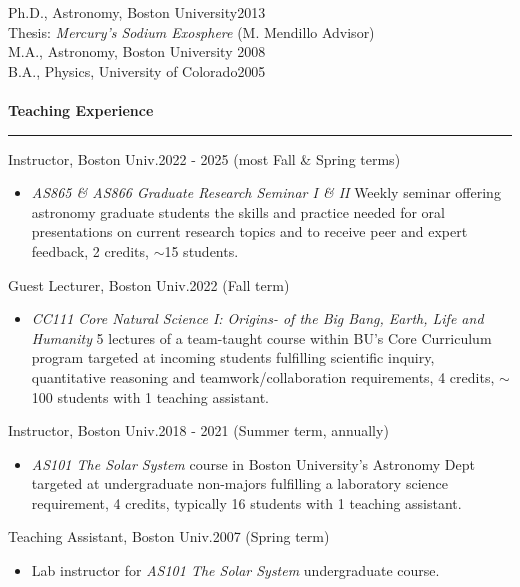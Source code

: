 \documentclass[12pt]{report}
\begin{document}
\noindent Ph.D., Astronomy, Boston University\hfill 2013\\
\indent Thesis: {\it Mercury's Sodium Exosphere} (M. Mendillo Advisor)\\
\noindent M.A., Astronomy, Boston University \hfill 2008\\
\noindent B.A., Physics, University of Colorado\hfill 2005\\
\vspace{2 mm}\\
%
%
\bf{Teaching Experience}\rm \hspace*{\fill} \\
\rule{\textwidth}{1pt}
\noindent Instructor, Boston Univ.\hfill 2022 - 2025 (most Fall \& Spring terms)
   \begin{itemize} \itemsep -2pt %
   \item \textit{AS865 \& AS866 Graduate Research Seminar I \& II} Weekly seminar offering astronomy graduate students the skills and practice needed for oral presentations on current research topics and to receive peer and expert feedback, 2 credits, $\sim$15 students.
 \end{itemize}
\noindent Guest Lecturer, Boston Univ.\hfill 2022 (Fall term)
   \begin{itemize} \itemsep -2pt %
   \item \textit{CC111 Core Natural Science I: Origins- of the Big Bang, Earth, Life and Humanity} 5 lectures of a team-taught course within BU's Core Curriculum program targeted at incoming students fulfilling scientific inquiry, quantitative reasoning and teamwork/collaboration requirements, 4 credits, $\sim$100 students with 1 teaching assistant.
 \end{itemize}
\noindent Instructor, Boston Univ.\hfill 2018 - 2021 (Summer term, annually)
   \begin{itemize} \itemsep -2pt %
   \item \textit{AS101 The Solar System} course in Boston University's Astronomy Dept targeted at undergraduate
non-majors fulfilling a laboratory science requirement, 4 credits, typically 16 students with 1 teaching assistant.
 \end{itemize}
\noindent Teaching Assistant, Boston Univ.\hfill 2007 (Spring term)
   \begin{itemize} \itemsep -2pt %
   \item Lab instructor for \textit{AS101 The Solar System} undergraduate course.
 \end{itemize}
\end{document}
